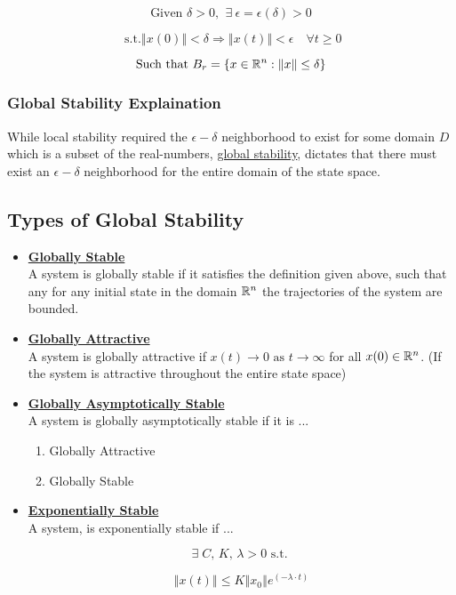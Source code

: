 $$
\text{Given } \delta>0 \text{,  }\: \exists \: \epsilon = \epsilon(\delta) > 0$$

$$ \text{ s.t.} \left\Vert x(0) \right\Vert < \delta \Rightarrow \left\Vert x(t) \right\Vert < \epsilon \quad \forall t \geq 0
$$

$$
\text{Such that } B_r = \{ x \in \mathbb{R}^n : \left\Vert x \right\Vert \leq \delta \}
$$

\subsubsection*{Global Stability Explaination}
While local stability required the $\epsilon-\delta$ neighborhood to exist for some domain $D$ which is a subset of the real-numbers, \underline{global stability}, dictates that there must exist an $\epsilon-\delta$ neighborhood for the entire domain of the state space.

\subsection*{Types of Global Stability}


\begin{itemize}
  \item \textbf{\underline{Globally Stable}} \\

  A system is globally stable if it satisfies the definition given above, such that any for any initial state in the domain $\mathbb{R}^n$ the trajectories of the system are bounded.

  \item \textbf{\underline{Globally Attractive}} \\

  A system is globally attractive if $x(t) \rightarrow 0 \text{ as } t \rightarrow \infty$ for all $x(0) \in \mathbb{R}^n$. (If the system is attractive throughout the entire state space)

  \item \textbf{\underline{Globally Asymptotically Stable}} \\

  A system is globally asymptotically stable if it is ... \\

  \begin{enumerate}
    \item Globally Attractive
    \item Globally Stable
  \end{enumerate}

  \item \textbf{\underline{Exponentially Stable}} \\

  A system, is exponentially stable if ...

  $$
\exists \; C \text{, } K \text{, } \lambda > 0 \text{ s.t. }
  $$

  $$
  \left\Vert x(t) \right\Vert \leq K \left\Vert x_0 \right\Vert e^{\left( -\lambda\cdot t \right)}
  $$
\end{itemize}


